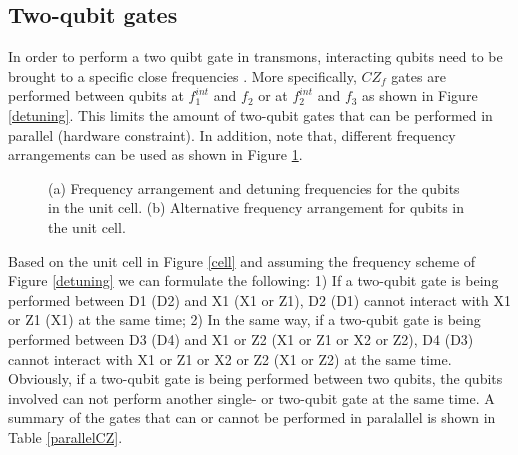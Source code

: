 \documentclass[11pt]{article}
\begin{document}
\subsection{Two-qubit gates}

In order to perform a two quibt gate in transmons, interacting qubits need to be brought to a specific close frequencies \cite{versluis2016scalable}. More specifically, $CZ_f$ gates are performed between qubits at $f^{int}_1$ and $f_2$ or at $f^{int}_2$ and $f_3$ as shown in Figure \ref{detuning}. This limits the amount of two-qubit gates that can be performed in parallel (hardware constraint). In addition, note that, different frequency arrangements can be used as shown in Figure \ref{sequence}. 


\begin{figure}[h!]
\centerline{
}
\caption{(a) Frequency arrangement and detuning frequencies for the qubits in the unit cell. (b) Alternative frequency arrangement for qubits in the unit cell.}
\label{sequence}
\end{figure}


Based on the unit cell in Figure \ref{cell} and assuming the frequency scheme of Figure \ref{detuning} we can formulate the following: 1) If a two-qubit gate is being performed between D1 (D2) and X1 (X1 or Z1), D2 (D1) cannot interact with X1 or Z1 (X1) at the same time; 2) In the same way, if a two-qubit gate is being performed between D3 (D4) and X1 or Z2 (X1 or Z1 or X2 or Z2), D4 (D3) cannot interact with X1 or Z1 or X2 or Z2 (X1 or Z2) at the same time. Obviously,  if a two-qubit gate is being performed between two qubits, the qubits involved can not perform another single- or two-qubit gate at the same time. A summary of the gates that can or cannot be performed in paralallel is shown in Table \ref{parallelCZ}.
\end{document}
